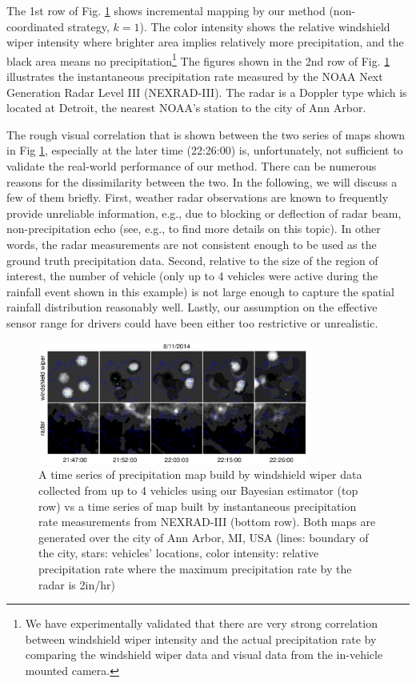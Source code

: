 \documentclass[journal]{IEEEtran}
\begin{document}
The 1st row of Fig. \ref{fig:fig8} shows incremental mapping by our method (non-coordinated strategy, $k=1$). The color intensity shows the relative windshield wiper intensity where brighter area implies relatively more precipitation, and the black area means no precipitation\footnote{We have experimentally validated that there are very strong correlation between windshield wiper intensity and the actual precipitation rate by comparing the windshield wiper data and visual data from the in-vehicle mounted camera.}
The figures shown in the 2nd row of Fig. \ref{fig:fig8} illustrates the instantaneous precipitation rate measured by the 
NOAA Next Generation Radar Level III (NEXRAD-III).
The radar is a Doppler type which is located at Detroit, the nearest NOAA's station to the city of Ann Arbor. 

The rough visual correlation that is shown between the two series of maps shown in Fig \ref{fig:fig8}, especially at the later time (22:26:00) is, unfortunately, not sufficient to validate the real-world performance of our method. 
There can be numerous reasons for the dissimilarity between the two. In the following, we will discuss a few of them briefly. First, weather radar observations are known to frequently provide unreliable information, e.g., due to blocking or deflection of radar beam, non-precipitation echo (see, e.g., \cite{berg2016creation} to find more details on this topic). In other words, the radar measurements are not consistent enough to be used as the ground truth precipitation data.
Second, relative to the size of the region of interest, the number of vehicle (only up to 4 vehicles were active during the rainfall event shown in this example) is not large enough to capture the spatial rainfall distribution reasonably well.
Lastly, our assumption on the effective sensor range for drivers could have been either too restrictive or unrealistic.


\begin{figure}
	\centering
	\includegraphics[width=3.5in]{figure/wind_wiper_data3}
	\caption{A time series of precipitation map build by windshield wiper data collected from up to 4 vehicles using our Bayesian estimator (top row) vs a time series of map built by instantaneous precipitation rate measurements from NEXRAD-III (bottom row). Both maps are generated over the city of Ann Arbor, MI, USA (lines: boundary of the city, stars: vehicles' locations, color intensity: relative precipitation rate where the maximum precipitation rate by the radar is 2in/hr)}
	\label{fig:fig8}
\end{figure}
\end{document}
